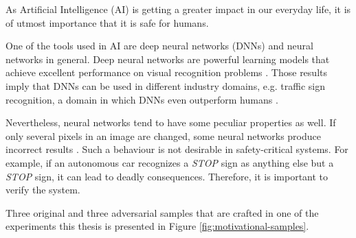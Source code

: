 As Artificial Intelligence (AI) is getting a greater impact in our everyday life, it is of utmost importance that it is safe for humans.  

One of the tools used in AI are deep neural networks (DNNs) and neural networks in general. Deep neural networks are powerful learning models that achieve excellent performance on visual recognition problems \cite{krizhevsky2012imagenet}. Those results imply that DNNs can be used in different industry domains, e.g. traffic sign recognition, a domain in which DNNs even outperform humans \cite{outperformhumans}. 

Nevertheless, neural networks tend to have some peculiar properties as well. If only several pixels in an image are changed, some neural networks produce incorrect results \cite{szegedy2013intriguing}. Such a behaviour is not desirable in safety-critical systems. For example, if an autonomous car recognizes a  \textit{STOP} sign as anything else but a \textit{STOP} sign, it can lead to deadly consequences. Therefore, it is important to verify the system. 

Three original and three adversarial samples that are crafted in one of the experiments this thesis is presented in Figure \ref{fig:motivational-samples}.

